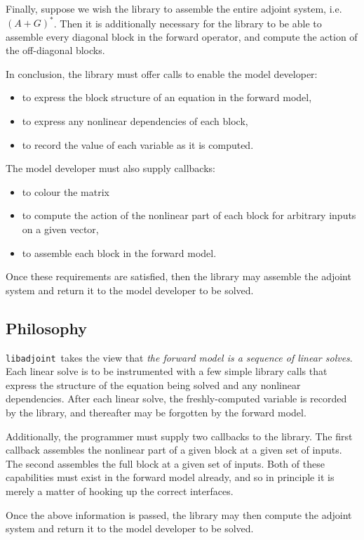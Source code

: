 \documentclass[10pt,authoryear]{elsarticle}
\newcommand{\libadjoint}[0]{{\texttt{libadjoint}}}
\begin{document}
Finally, suppose we wish the library to assemble the entire adjoint system, i.e. $(A+G)^{*}$. Then it is additionally necessary for the library
to be able to assemble every diagonal block in the forward operator, and compute the action of the off-diagonal blocks.

In conclusion, the library must offer calls to enable the model developer:
\begin{itemize}
\item to express the block structure of an equation in the forward model,
\item to express any nonlinear dependencies of each block,
\item to record the value of each variable as it is computed.
\end{itemize}
The model developer must also supply callbacks:
\begin{itemize}
\item to colour the matrix
\item to compute the action of the nonlinear part of each block for arbitrary inputs on a given vector,
\item to assemble each block in the forward model.
\end{itemize}
Once these requirements are satisfied, then the library may assemble the adjoint system and return
it to the model developer to be solved.

\subsection{Philosophy}
\libadjoint\ takes the view that \emph{the forward model is a sequence of linear solves}. Each linear solve
is to be instrumented with a few simple library calls that express the structure of the equation being solved
and any nonlinear dependencies. After each linear solve, the freshly-computed variable is recorded by the
library, and thereafter may be forgotten by the forward model. 

Additionally, the programmer must supply two callbacks to the library. The first callback assembles the nonlinear part of
a given block at a given set of inputs. The second assembles the full block at a given set of inputs. Both
of these capabilities must exist in the forward model already, and so in principle it is merely a matter of
hooking up the correct interfaces. 

Once the above information is passed, the library may then compute the adjoint system and return it to the model developer
to be solved.
\end{document}
